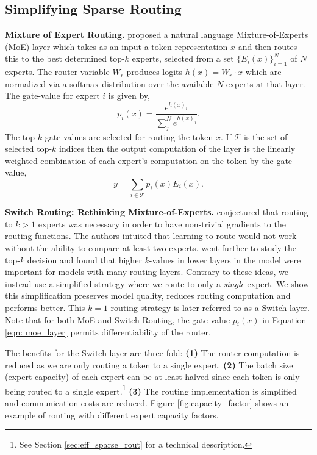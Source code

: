 \documentclass[twoside,11pt]{article}
\begin{document}
\subsection{Simplifying Sparse Routing}
\textbf{Mixture of Expert Routing.}
\citet{shazeer2017outrageously} proposed a natural language Mixture-of-Experts (MoE) layer which takes as an input a token representation $x$ and then routes this to the best determined top-$k$ experts, selected from a set $\{E_i(x)\}_{i=1}^N$ of $N$ experts.
The router variable $W_r$ produces logits $h(x) = W_r \cdot x$ which are normalized via a softmax distribution over the available $N$ experts at that layer. The gate-value for expert $i$ is given by,
\begin{equation}
    p_i(x) = \frac{e^{h(x)_i}}{\sum_j^N e^{h(x)_j}}.
\end{equation}
The top-$k$ gate values are selected for routing the token $x$.
If $\mathcal{T}$ is the set of selected top-$k$ indices then the output computation of the layer is the linearly weighted combination of each expert's computation on the token by the gate value,
\begin{equation}\label{eqn: moe_layer}
    y = \sum_{i \in \mathcal{T}} p_i(x) E_i(x). 
\end{equation}

\textbf{Switch Routing: Rethinking Mixture-of-Experts.} 
\citet{shazeer2017outrageously} conjectured that routing to $k>1$ experts was necessary in order to have non-trivial gradients to the routing functions.
The authors intuited that learning to route would not work without the ability to compare at least two experts.
\citet{ramachandran2018diversity} went further to study the top-$k$ decision and found that higher $k$-values in lower layers in the model were important for models with many routing layers.
Contrary to these ideas, we instead use a simplified strategy where we route to only a \emph{single} expert.
We show this simplification preserves model quality, reduces routing computation and performs better.
This $k=1$ routing strategy is later referred to as a Switch layer.
Note that for both MoE and Switch Routing, the gate value $p_i(x)$ in Equation \ref{eqn: moe_layer} permits differentiability of the router.

The benefits for the Switch layer are three-fold:
\textbf{(1)} The router computation is reduced as we are only routing a token to a single expert.
\textbf{(2)} The batch size (expert capacity) of each expert can be at least halved since each token is only being routed to a single expert.\footnote{See Section \ref{sec:eff_sparse_rout} for a technical description.}
\textbf{(3)} The routing implementation is simplified and communication costs are reduced.
Figure \ref{fig:capacity_factor} shows an example of routing with different expert capacity factors.
 
\end{document}
